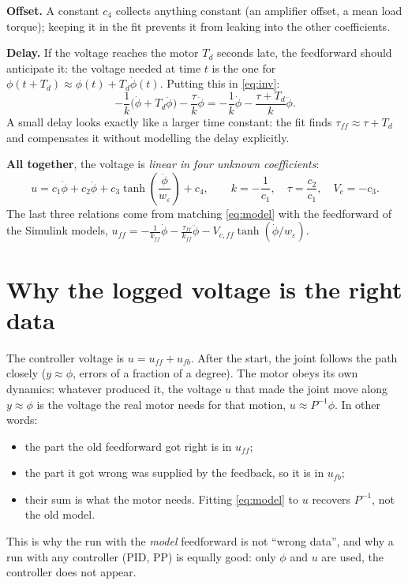 \documentclass[10pt,a4paper]{article}
\begin{document}
\textbf{Offset.} A constant $c_4$ collects anything constant (an amplifier offset, a mean load torque); keeping it in the
fit prevents it from leaking into the other coefficients.

\textbf{Delay.} If the voltage reaches the motor $T_d$ seconds late, the feedforward should anticipate it: the voltage needed
at time $t$ is the one for $\phi(t+T_d)\approx\phi(t)+T_d\dot\phi(t)$. Putting this in \eqref{eq:inv}:
\begin{equation}
  -\frac{1}{k}\bigl(\dot\phi+T_d\ddot\phi\bigr)-\frac{\tau}{k}\ddot\phi
  =-\frac{1}{k}\dot\phi-\frac{\tau+T_d}{k}\ddot\phi .
\end{equation}
A small delay looks exactly like a larger time constant: the fit finds $\tau_{ff}\approx\tau+T_d$ and compensates it without
modelling the delay explicitly.

\textbf{All together}, the voltage is \emph{linear in four unknown coefficients}:
\begin{equation}\label{eq:model}
  u = c_1\dot\phi + c_2\ddot\phi + c_3\tanh\!\left(\frac{\dot\phi}{w_\varepsilon}\right) + c_4,
  \qquad
  k=-\frac{1}{c_1},\quad \tau=\frac{c_2}{c_1},\quad V_c=-c_3 .
\end{equation}
The last three relations come from matching \eqref{eq:model} with the feedforward of the Simulink models,
$u_{ff}=-\frac{1}{k_{ff}}\dot\phi-\frac{\tau_{ff}}{k_{ff}}\ddot\phi-V_{c,ff}\tanh(\dot\phi/w_\varepsilon)$.

\section{Why the logged voltage is the right data}

The controller voltage is $u=u_{ff}+u_{fb}$. After the start, the joint follows the path closely ($y\approx\phi$, errors of a
fraction of a degree). The motor obeys its own dynamics: whatever produced it, the voltage $u$ that made the joint move along
$y\approx\phi$ is the voltage the real motor needs for that motion, $u\approx P^{-1}\phi$. In other words:
\begin{itemize}
  \item the part the old feedforward got right is in $u_{ff}$;
  \item the part it got wrong was supplied by the feedback, so it is in $u_{fb}$;
  \item their sum is what the motor needs. Fitting \eqref{eq:model} to $u$ recovers $P^{-1}$, not the old model.
\end{itemize}
This is why the run with the \emph{model} feedforward is not ``wrong data'', and why a run with any controller (PID, PP) is
equally good: only $\phi$ and $u$ are used, the controller does not appear.
\end{document}
